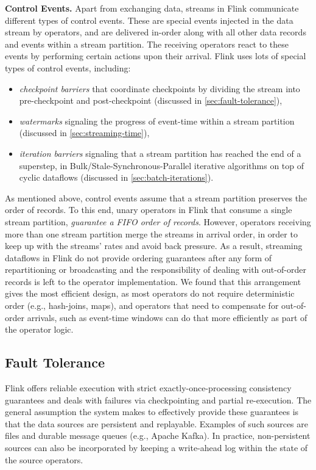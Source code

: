 \documentclass[11pt]{article}
\newcommand{\para}[1]{\vspace{2mm}\noindent\textbf{#1}}
\begin{document}
\para{Control Events.} Apart from exchanging data, streams in Flink communicate different types of control events. These are special events injected in the data stream by operators, and are delivered in-order along with all other data records and events within a stream partition. The receiving operators react to these events by performing certain actions upon their arrival. Flink uses lots of special types of control events, including: \vspace{-2mm}
\begin{itemize}
\item \textit{checkpoint barriers} that coordinate checkpoints by dividing the stream into pre-checkpoint and post-checkpoint (discussed in \autoref{sec:fault-tolerance}), \vspace{-3mm}
\item \textit{watermarks} signaling the progress of event-time within a stream partition (discussed in \autoref{sec:streaming-time}), \vspace{-3mm}
\item \textit{iteration barriers} signaling that a stream partition has reached the end of a superstep, in Bulk/Stale-Synchronous-Parallel iterative algorithms on top of cyclic dataflows (discussed in \autoref{sec:batch-iterations}). \vspace{-1mm}
\end{itemize}

As mentioned above, control events assume that a stream partition preserves the order of records. To this end, unary operators in Flink that consume a single stream partition, \emph{guarantee a FIFO order of records}. However, operators receiving more than one stream partition merge the streams in arrival order, in order to keep up with the streams' rates and avoid back pressure. As a result, streaming dataflows in Flink do not provide ordering guarantees after any form of repartitioning or broadcasting and the responsibility of dealing with out-of-order records is left to the operator implementation. We found that this arrangement gives the most efficient design, as most operators do not require deterministic order (e.g., hash-joins, maps), and operators that need to compensate for out-of-order arrivals, such as event-time windows can do that more efficiently as part of the operator logic.

\vspace{-3mm}
\subsection{Fault Tolerance}
\label{sec:fault-tolerance}
\vspace{-2mm}
Flink offers reliable execution with strict exactly-once-processing consistency guarantees and deals with failures via checkpointing and partial re-execution. The general assumption the system makes to effectively provide these guarantees is that the data sources are persistent and replayable. Examples of such sources are files and durable message queues (e.g., Apache Kafka). In practice, non-persistent sources can also be incorporated by keeping a write-ahead log within the state of the source operators.
\end{document}
